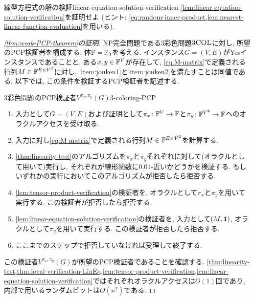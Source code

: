   \begin{exercise}{線型方程式の解の検証}{linear-equation-solution-verification}
    \cref{lem:linear-equation-solution-verification}を証明せよ (ヒント: \cref{eq:random-inner-product,lem:nearest-linear-function-evaluation}を用いる).
  \end{exercise}

  \begin{proof}[\cref{thm:weak-PCP-theorem}の証明]
    NP完全問題である3彩色問題$\textsc{3COL}$に対し, 所望のPCP検証者を構成する.
    体$\mathbb{F}=\mathbb{F}_3$を考える.
    インスタンス$G=(V,E)$がYesインスタンスであることと,
    ある$x,y\in\mathbb{F}^V$が存在して, \cref{eq:M-matrix}で定義される行列$M\in\mathbb{F}^{E\times V^2}$に対し,
    \ref{item:jouken1}と\ref{item:jouken2}を満たすことは同値である.
    以下では, この条件を検証するPCP検証者を記述する.

    \begin{algorithm}{3彩色問題のPCP検証者$V^{\pi_x,\pi_y}(G)$}{3-coloring-PCP}
      \begin{enumerate}
        \item 入力として$G=(V,E)$および証明として$\pi_x\colon\mathbb{F}^V\to\mathbb{F}$と$\pi_y\colon\mathbb{F}^{V^2}\to\mathbb{F}$へのオラクルアクセスを受け取る.
        \item 入力に対し\cref{eq:M-matrix}で定義される行列$M\in\mathbb{F}^{E\times V^2}$を計算する.
        \item \cref{thm:linearity-test}のアルゴリズムを$\pi_x$と$\pi_y$それぞれに対して(オラクルとして用いて)実行し, それぞれが線形関数に$0.01$-近いかどうかを検証する. もしいずれかの実行においてこのアルゴリズムが拒否したら拒否する.
        \item \cref{lem:tensor-product-verification}の検証者を, オラクルとして$\pi_x$と$\pi_y$を用いて実行する. この検証者が拒否したら拒否する.
        \item \cref{lem:linear-equation-solution-verification}の検証者を, 入力として$(M,\mathbf{1})$, オラクルとして$\pi_y$を用いて実行する. この検証者が拒否したら拒否する.
        \item ここまでのステップで拒否していなければ受理して終了する.
      \end{enumerate}
    \end{algorithm}

    この検証者$V^{\pi_x,\pi_y}(G)$が所望のPCP検証者であることを確認する.
    \cref{thm:linearity-test,thm:local-verification-LinEq,lem:tensor-product-verification,lem:linear-equation-solution-verification}ではそれぞれオラクルアクセスは$O(1)$回であり, 内部で用いるランダムビットは$O(n^2)$である.


\end{proof}
